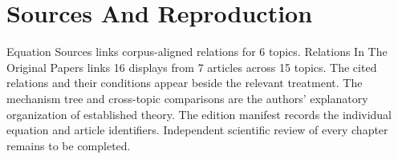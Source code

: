 \documentclass[11pt,oneside]{book}
\begin{document}
\chapter{Sources And Reproduction}

Equation Sources links corpus-aligned relations for 6 topics. Relations In The Original Papers links 16 displays from 7 articles across 15 topics. The cited relations and their conditions appear beside the relevant treatment. The mechanism tree and cross-topic comparisons are the authors' explanatory organization of established theory. The edition manifest records the individual equation and article identifiers. Independent scientific review of every chapter remains to be completed.
\end{document}
